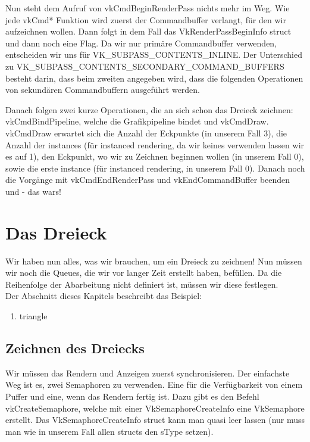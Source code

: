 \documentclass[11pt,a4paper]{report}
\begin{document}
Nun steht dem Aufruf von vkCmdBeginRenderPass nichts mehr im Weg. Wie jede vkCmd* Funktion wird zuerst der Commandbuffer verlangt, für den wir aufzeichnen wollen. Dann folgt in dem Fall das VkRenderPassBeginInfo struct und dann noch eine Flag. Da wir nur primäre Commandbuffer verwenden, entscheiden wir uns für VK\_SUBPASS\_CONTENTS\_INLINE. Der Unterschied zu VK\_SUBPASS\_CONTENTS\_SECONDARY\_COMMAND\_BUFFERS besteht darin, dass beim zweiten angegeben wird, dass die folgenden Operationen von sekundären Commandbuffern ausgeführt werden.

Danach folgen zwei kurze Operationen, die an sich schon das Dreieck zeichnen: vkCmdBindPipeline, welche die Grafikpipeline bindet und vkCmdDraw. vkCmdDraw erwartet sich die Anzahl der Eckpunkte (in unserem Fall 3), die Anzahl der instances (für instanced rendering, da wir keines verwenden lassen wir es auf 1), den Eckpunkt, wo wir zu Zeichnen beginnen wollen (in unserem Fall 0), sowie die erste instance (für instanced rendering, in unserem Fall 0). Danach noch die Vorgänge mit vkCmdEndRenderPass und vkEndCommandBuffer beenden und - das wars!

\chapter{Das Dreieck}
Wir haben nun alles, was wir brauchen, um ein Dreieck zu zeichnen! Nun müssen wir noch die Queues, die wir vor langer Zeit erstellt haben, befüllen. Da die Reihenfolge der Abarbeitung nicht definiert ist, müssen wir diese festlegen.\\
Der Abschnitt dieses Kapitels beschreibt das Beispiel:
\begin{enumerate}
	\item{triangle}
\end{enumerate}

\section{Zeichnen des Dreiecks}
Wir müssen das Rendern und Anzeigen zuerst synchronisieren. Der einfachste Weg ist es, zwei Semaphoren zu verwenden. Eine für die Verfügbarkeit von einem Puffer und eine, wenn das Rendern fertig ist. Dazu gibt es den Befehl vkCreateSemaphore, welche mit einer VkSemaphoreCreateInfo eine VkSemaphore erstellt. Das VkSemaphoreCreateInfo struct kann man quasi leer lassen (nur muss man wie in unserem Fall allen structs den sType setzen).
\end{document}
